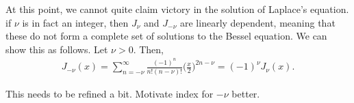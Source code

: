 At this point, we cannot quite claim victory in the solution of Laplace's equation.
if $\nu$ is in fact an integer, then $J_{\nu}$ and $J_{-\nu}$ are linearly dependent, meaning that these do not form a complete set of solutions to the Bessel equation.
We can show this as follows.
Let $\nu > 0$.
Then,
\begin{align}
    J_{-\nu}(x) = \sum_{n=-\nu}^{\infty} \frac{(-1)^{n}}{n!(n-\nu)!} \Big( \frac{x}{2} \Big)^{2n-\nu} = (-1)^{\nu} J_{\nu}(x)
.\end{align}

{\color{red} This needs to be refined a bit. Motivate index for $-\nu$ better.}



